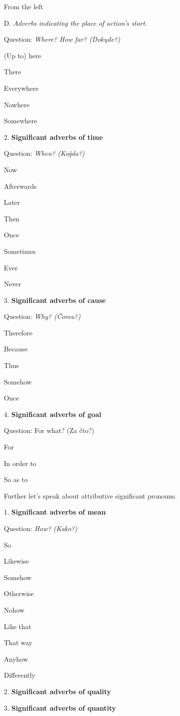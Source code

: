 From the left


D. \textit{Adverbs indicating the place of action’s start.}

Question: \textit{Where? How far? (Dokųde?)}

(Up to) here

There

Everywhere

Nowhere

Somewhere


2. \textbf{Significant adverbs of time}

Question: \textit{When? (Koĝda?)}

Now

Afterwards

Later

Then

Once

Sometimes

Ever

Never


3. \textbf{Significant adverbs of cause}

Question: \textit{Why? (Čomu?)}

Therefore

Because

Thus

Somehow

Once


4. \textbf{Significant adverbs of goal}

Question: For what? (Za čto?)

For

In order to

So as to


Further let’s speak about attributive significant pronouns.

1. \textbf{Significant adverbs of mean}

Question: \textit{How? (Kako?)}

So

Likewise

Somehow

Otherwise

Nohow

Like that

That way

Anyhow

Differently

2. \textbf{Significant adverbs of quality}


3.\textbf{ Significant adverbs of quantity}

